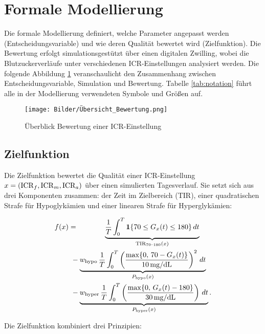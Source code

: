 \section{Formale Modellierung} \label{modellierung}

Die formale Modellierung definiert, welche Parameter angepasst werden (Entscheidungsvariable) und wie deren Qualität bewertet wird (Zielfunktion). Die Bewertung erfolgt simulationsgestützt über einen digitalen Zwilling, wobei die Blutzuckerverläufe unter verschiedenen ICR-Einstellungen analysiert werden. Die folgende Abbildung \ref{fig:überblick} veranschaulicht den Zusammenhang zwischen Entscheidungsvariable, Simulation und Bewertung. Tabelle \ref{tab:notation} führt alle in der Modellierung verwendeten Symbole und Größen auf.

\begin{figure}[h!]
    \centering
    \texttt{[image: Bilder/Übersicht\_Bewertung.png]}
    \caption{Überblick Bewertung einer ICR-Einstellung}
    \label{fig:überblick}
\end{figure}

\subsection{Zielfunktion}

Die Zielfunktion bewertet die Qualität einer ICR-Einstellung \(x = (\mathrm{ICR}_f, \mathrm{ICR}_m, \mathrm{ICR}_a)\) über einen simulierten Tagesverlauf. Sie setzt sich aus drei Komponenten zusammen: der Zeit im Zielbereich (TIR), einer quadratischen Strafe für Hypoglykämien und einer linearen Strafe für Hyperglykämien:

\begin{align*}
f(x)
&= \phantom{-\,w_{\mathrm{hypo}}\,}\underbrace{\frac{1}{T}\int_{0}^{T}\Ind\{70 \le G_{x}(t) \le 180\}\,dt}_{\mathrm{TIR}_{70\text{--}180}(x)} \\
&\ - \underbrace{w_{\mathrm{hypo}}\,\frac{1}{T}\int_{0}^{T}\left(\frac{\max\{0,\,70 - G_{x}(t)\}}{\Hhypo}\right)^{2}\,dt}_{P_{\mathrm{hypo}}(x)} \\
&\ - \underbrace{w_{\mathrm{hyper}}\,\frac{1}{T}\int_{0}^{T}\left(\frac{\max\{0,\,G_{x}(t) - 180\}}{\Hhyper}\right)\,dt}_{P_{\mathrm{hyper}}(x)}.
\end{align*}

\noindent Die Zielfunktion kombiniert drei Prinzipien:


